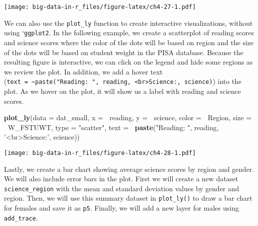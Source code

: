 \documentclass[]{book}
\newenvironment{Shaded}{\begin{snugshade}}{\end{snugshade}}
\newcommand{\DataTypeTok}[1]{\textcolor[rgb]{0.13,0.29,0.53}{#1}}
\newcommand{\KeywordTok}[1]{\textcolor[rgb]{0.13,0.29,0.53}{\textbf{#1}}}
\newcommand{\NormalTok}[1]{#1}
\newcommand{\OperatorTok}[1]{\textcolor[rgb]{0.81,0.36,0.00}{\textbf{#1}}}
\newcommand{\StringTok}[1]{\textcolor[rgb]{0.31,0.60,0.02}{#1}}
\begin{document}
\texttt{[image: big-data-in-r\_files/figure-latex/ch4-27-1.pdf]}

We can also use the \texttt{plot\_ly} function to create interactive visualizations, without using `\texttt{ggplot2}. In the following example, we create a scatterplot of reading scores and science scores where the color of the dots will be based on region and the size of the dots will be based on student weight in the PISA database. Because the resulting figure is interactive, we can click on the legend and hide some regions as we review the plot. In addition, we add a hover text (\texttt{text\ =\ \textasciitilde{}paste("Reading:\ ",\ reading,\ \textquotesingle{}\textless{}br\textgreater{}Science:\textquotesingle{},\ science)}) into the plot. As we hover on the plot, it will show us a label with reading and science scores.

\begin{Shaded}
\begin{Highlighting}[]
\KeywordTok{plot_ly}\NormalTok{(}\DataTypeTok{data =}\NormalTok{ dat_small,}
        \DataTypeTok{x =} \OperatorTok{~}\NormalTok{reading, }\DataTypeTok{y =} \OperatorTok{~}\NormalTok{science, }\DataTypeTok{color =} \OperatorTok{~}\NormalTok{Region,}
        \DataTypeTok{size =} \OperatorTok{~}\NormalTok{W_FSTUWT,}
        \DataTypeTok{type =} \StringTok{"scatter"}\NormalTok{,}
        \DataTypeTok{text =} \OperatorTok{~}\KeywordTok{paste}\NormalTok{(}\StringTok{"Reading: "}\NormalTok{, reading, }\StringTok{'<br>Science:'}\NormalTok{, science))}
\end{Highlighting}
\end{Shaded}

\texttt{[image: big-data-in-r\_files/figure-latex/ch4-28-1.pdf]}

Lastly, we create a bar chart showing average science scores by region and gender. We will also include error bars in the plot. First we will create a new dataset \texttt{science\_region} with the mean and standard deviation values by gender and region. Then, we will use this summary dataset in \texttt{plot\_ly()} to draw a bar chart for females and save it as \texttt{p5}. Finally, we will add a new layer for males using \texttt{add\_trace}.
\end{document}

